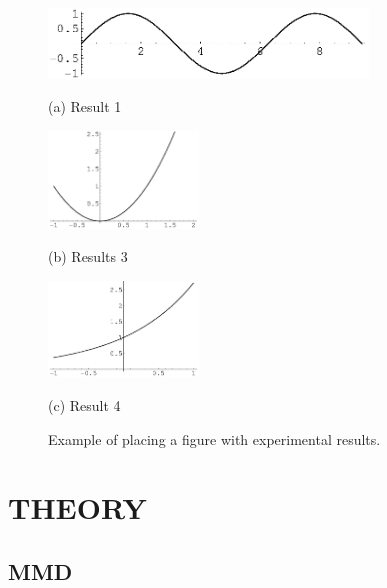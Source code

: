 \documentclass{article}
\begin{document}
\begin{figure}[htb]

  \begin{minipage}[b]{1.0\linewidth}
    \centering
    \centerline{\includegraphics[width=8.5cm]{image1}}
    \centerline{(a) Result 1}\medskip
  \end{minipage}
  \begin{minipage}[b]{.48\linewidth}
    \centering
    \centerline{\includegraphics[width=4.0cm]{image3}}
    \centerline{(b) Results 3}\medskip
  \end{minipage}
  \hfill
  \begin{minipage}[b]{0.48\linewidth}
    \centering
    \centerline{\includegraphics[width=4.0cm]{image4}}
    \centerline{(c) Result 4}\medskip
  \end{minipage}
  \caption{Example of placing a figure with experimental results.}
  \label{fig:res}
  \end{figure}
  

\section{THEORY}
\label{sec:theory}

\subsection{MMD}
\label{ssec:mmd}
\end{document}
